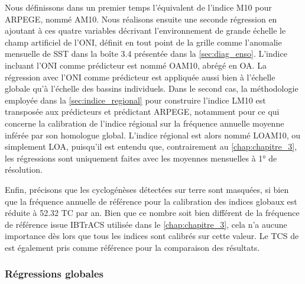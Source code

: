 \documentclass[../main.tex]{subfiles}
\begin{document}
Nous définissons dans un premier temps l'équivalent de l'indice M10 pour ARPEGE, nommé AM10. Nous réalisons ensuite une seconde régression en ajoutant à
ces quatre variables décrivant l'environnement de grande échelle le champ artificiel de l'ONI, définit en tout point de la grille comme l'anomalie
mensuelle de SST dans la boîte 3.4 présentée dans la \cref{sec:diag_enso}. L'indice incluant l'ONI comme prédicteur est nommé OAM10, abrégé en OA. La régression
avec l'ONI comme prédicteur est appliquée aussi bien à l'échelle globale qu'à l'échelle des bassins individuels. Dans le second cas, la méthodologie employée
dans la \cref{sec:indice_regional} pour construire l'indice LM10 est transposée aux prédicteurs et prédictant ARPEGE, notamment pour ce qui concerne la
calibration de l'indice régional sur la fréquence annuelle moyenne inférée par son homologue global. L'indice régional est alors nommé LOAM10, ou simplement
LOA, puisqu'il est entendu que, contrairement au \cref{chap:chapitre_3}, les régressions sont uniquement faites avec les moyennes mensuelles à \ang{1} de
résolution.

Enfin, précisons que les cyclogénèses détectées sur terre sont masquées, si bien que la fréquence annuelle de référence pour la calibration des indices globaux
est réduite à \num{52.32} TC par an. Bien que ce nombre soit bien différent de la fréquence de référence issue IBTrACS utilisée dans le \cref{chap:chapitre_3},
cela n'a aucune importance dès lors que tous les indices sont calibrés sur cette valeur. Le TCS de \textcite{tippett_poisson_2011} est également pris comme
référence pour la comparaison des résultats.

\subsubsection{Régressions globales}
\end{document}
